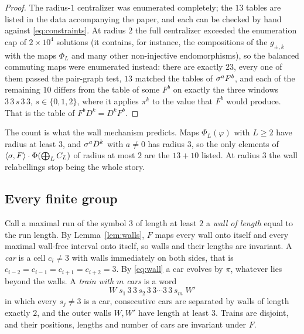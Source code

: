 \begin{proof}
The radius-$1$ centralizer was enumerated completely; the $13$ tables are listed in the data accompanying the paper, and each can be checked by hand against \eqref{eq:constraints}. At radius $2$ the full centralizer exceeded the enumeration cap of $2\times10^4$ solutions (it contains, for instance, the compositions of the $g_{\pm,k}$ with the maps $\Phi_L$ and many other non-injective endomorphisms), so the balanced commuting maps were enumerated instead: there are exactly $23$, every one of them passed the pair-graph test, $13$ matched the tables of $\sigma^aF^b$, and each of the remaining $10$ differs from the table of some $F^b$ on exactly the three windows $3\,3\,s\,3\,3$, $s\in\{0,1,2\}$, where it applies $\pi^{k}$ to the value that $F^b$ would produce. That is the table of $F^bD^k=D^kF^b$.
\end{proof}

The count is what the wall mechanism predicts. Maps $\Phi_L(\varphi)$ with $L\ge2$ have radius at least $3$, and $\sigma^aD^k$ with $a\ne0$ has radius $3$, so the only elements of $\langle\sigma,F\rangle\cdot\Phi(\bigoplus_LC_L)$ of radius at most $2$ are the $13+10$ listed. At radius $3$ the wall relabellings stop being the whole story.

\subsection{Every finite group}\label{sec:trains}

Call a maximal run of the symbol $3$ of length at least $2$ a \emph{wall of length} equal to the run length. By Lemma~\ref{lem:walls}, $F$ maps every wall onto itself and every maximal wall-free interval onto itself, so walls and their lengths are invariant. A \emph{car} is a cell $c_i\ne3$ with walls immediately on both sides, that is $c_{i-2}=c_{i-1}=c_{i+1}=c_{i+2}=3$. By \eqref{eq:wall} a car evolves by $\pi$, whatever lies beyond the walls. A \emph{train with $m$ cars} is a word
\[
W\;s_1\,3\,3\,s_2\,3\,3\cdots3\,3\,s_m\;W'
\]
in which every $s_j\ne3$ is a car, consecutive cars are separated by walls of length exactly $2$, and the outer walls $W,W'$ have length at least $3$. Trains are disjoint, and their positions, lengths and number of cars are invariant under $F$.

